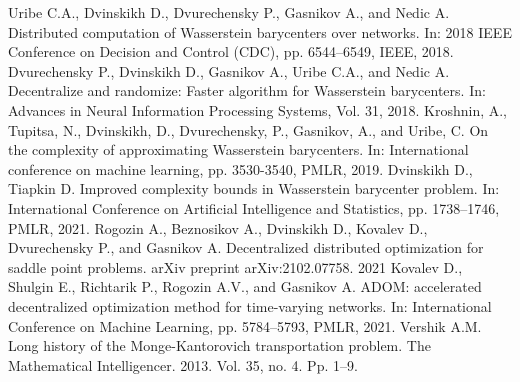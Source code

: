 \begin{thebibliography}{9}



  Uribe C.A.,  Dvinskikh D.,  Dvurechensky
P.,  Gasnikov A., and  Nedic A.   Distributed
computation of Wasserstein barycenters over networks.  In: 2018 IEEE
Conference on
Decision and Control (CDC), pp. 6544–6549, IEEE, 2018.
     Dvurechensky
P., Dvinskikh D., Gasnikov A., Uribe C.A., and  Nedic A.   Decentralize and randomize: Faster algorithm for Wasserstein barycenters.  In: Advances in Neural Information Processing Systems, Vol. 31, 2018.
  Kroshnin, A., Tupitsa, N., Dvinskikh, D., Dvurechensky, P., Gasnikov, A., and Uribe, C. On the complexity of approximating Wasserstein barycenters. In: International conference on machine learning, pp. 3530-3540, PMLR, 2019.
  Dvinskikh D., Tiapkin D. Improved complexity bounds in Wasserstein barycenter problem. In: International Conference on Artificial Intelligence and Statistics, pp. 1738--1746, PMLR, 2021.
 Rogozin A., Beznosikov A., Dvinskikh D., Kovalev D., Dvurechensky P., and Gasnikov A.  Decentralized distributed optimization for saddle point problems. arXiv preprint arXiv:2102.07758. 2021
   Kovalev D.,   Shulgin E.,   Richtarik P.,   
Rogozin A.V., and   Gasnikov A. ADOM: accelerated decentralized
optimization method for time-varying networks. In: International
Conference on Machine Learning, pp. 5784–5793, PMLR, 2021.
 Vershik A.M.  Long history of the
Monge-Kantorovich transportation problem.  The
Mathematical Intelligencer.   2013. Vol. 35, no. 4. Pp. 1--9.
\end{thebibliography}
%
%
%
%
%
%



%
